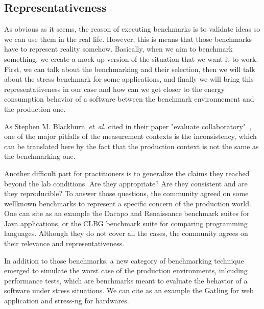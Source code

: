 \subsection{Representativeness}
As obvious as it seems, the reason of executing benchmarks is to validate ideas so we can use them in the real life.
However, this is means that those benchmarks have to represent reality somehow.
Basically, when we aim to benchmark something, we create a mock up version of the situation that we want it to work.
First, we can talk about the benchmarking and their selection, then we will talk about the stress benchmark for some applications, and finally we will bring this representativeness in our case and how can we get closer to the energy consumption behavior of a software between the benchmark environnement and the production one.

As Stephen M. Blackburn~\emph{et~al.} cited in their paper "evaluate collaboratory"~\cite{stephen_evaluate_2012}, one of the major pitfalls of the measurement contexts is the inconsistency, which can be translated here by the fact that the production context is not the same as the benchmarking one.

Another difficult part for practitioners is to generalize the claims they reached beyond the lab conditions.
Are they appropriate?
Are they consistent and are they reproducible?
To answer those questions, the community agreed on some wellknown benchmarks to represent a specific concern of the production world.
One can site as an example the Dacapo and Renaissance benchmark suites for Java applications, or the CLBG benchmark suite for comparing programming languages.
Although they do not cover all the cases, the community agrees on their relevance and representativeness.

In addition to those benchmarks, a new category of benchmarking technique emerged to simulate the worst case of the production environments, inlcuding performance tests, which are benchmarks meant to evaluate the behavior of a software under stress situations.
We can cite as an example the Gatling for web application and stress-ng for hardwares.%





